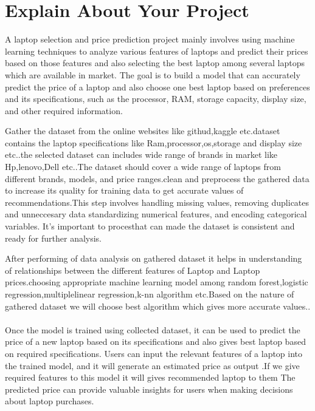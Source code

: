 

\section{Explain About Your Project}
A laptop selection and price prediction project mainly involves  using machine learning techniques to analyze various features of laptops and predict their prices based on those features and also selecting the best laptop among several laptops which are available in market. The goal is to build a model that can accurately predict the price of a laptop  and also choose one best laptop based on preferences and its specifications, such as the processor, RAM, storage capacity, display size, and other required information.
\par
Gather the  dataset from the online  websites like githud,kaggle etc.dataset contains the laptop specifications like Ram,processor,os,storage and display size etc..the selected dataset can includes  wide range of brands in market like Hp,lenovo,Dell etc..The dataset should cover a wide range of laptops from different brands, models, and price ranges.clean and preprocess the gathered data to increase its quality for training data to get accurate values of recommendations.This step involves handling missing values, removing duplicates and unneccesary data standardizing numerical features, and encoding categorical variables. It's important to procesthat can made the dataset is consistent and ready for further analysis.
\par 
After performing of data analysis on gathered dataset it helps in understanding of relationships between the different features of Laptop and Laptop prices.choosing  appropriate machine learning model among random forest,logistic regression,multiplelinear regression,k-nn algorithm etc.Based on the nature of gathered dataset we will choose best algorithm which gives more accurate values..
\paragraph{}
Once the model is trained using  collected dataset, it can be used to predict the price of a new laptop based on its specifications and also gives best laptop based on required specifications. Users can input the relevant features of a laptop into the trained model, and it will generate an estimated price as output .If we give required features to this model it will gives recommended laptop to them The predicted price can provide valuable insights for users when making decisions about laptop purchases.

